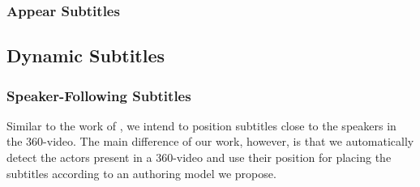 \subsubsection{Appear Subtitles}
\label{subsubsection:appear_subtitles}

\subsection{Dynamic Subtitles}
\label{subsection:dynamic_subtitles}

\subsubsection{Speaker-Following Subtitles}
\label{subsubsec:speaker_following}






Similar to the work of \cite{rothe_dynamic_2018}, we intend to position subtitles close to the speakers in the 360-video. The main difference of our work, however, is that we automatically detect the actors present in a 360-video and use their position for placing the subtitles according to an authoring model we propose.
  

